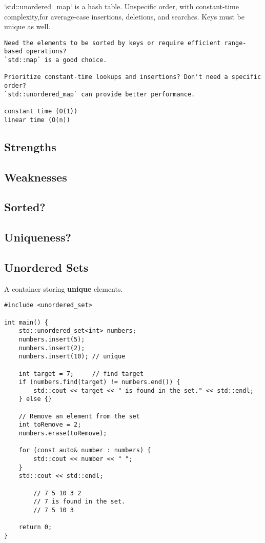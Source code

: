\documentclass[openany]{report}
\begin{document}
`std::unordered\_map` is a hash table. 
Unspecific order, with constant-time complexity,for average-case 
insertions, deletions, and searches. 
Keys must be unique as well.

\begin{verbatim}
Need the elements to be sorted by keys or require efficient range-based operations?
`std::map` is a good choice.

Prioritize constant-time lookups and insertions? Don't need a specific order? 
`std::unordered_map` can provide better performance.

constant time (O(1)) 
linear time (O(n))
\end{verbatim}

\subsection{Strengths}
\subsection{Weaknesses}
\subsection{Sorted?}
\subsection{Uniqueness?}

\subsection{Unordered Sets}

A container storing \textbf{unique} elements.

\begin{verbatim}
#include <unordered_set>

int main() {
    std::unordered_set<int> numbers;
    numbers.insert(5);
    numbers.insert(2);
    numbers.insert(10); // unique

    int target = 7;     // find target
    if (numbers.find(target) != numbers.end()) {
        std::cout << target << " is found in the set." << std::endl;
    } else {}

    // Remove an element from the set
    int toRemove = 2;
    numbers.erase(toRemove);

    for (const auto& number : numbers) {
        std::cout << number << " ";
    }
    std::cout << std::endl;

        // 7 5 10 3 2
        // 7 is found in the set.
        // 7 5 10 3

    return 0;
}
\end{verbatim}
\end{document}
